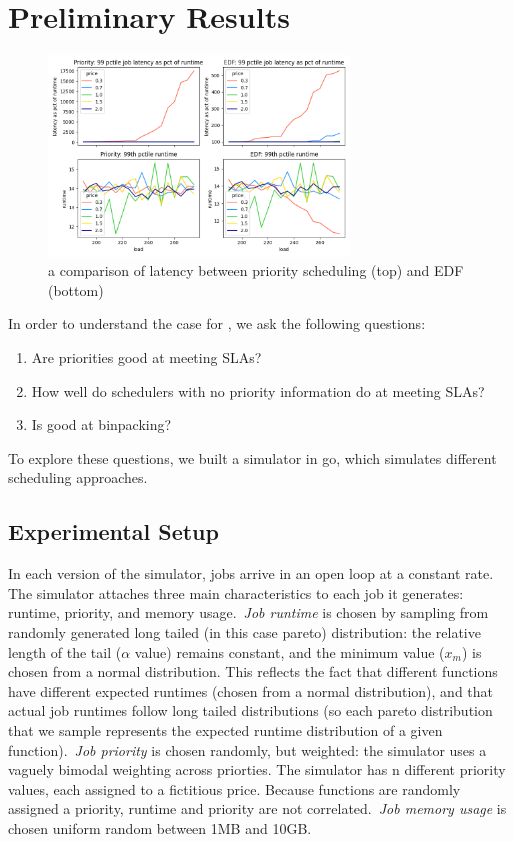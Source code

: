 \section{Preliminary Results}

\begin{figure}[t!]
    \centering
      \includegraphics[width=8cm]{img/ideal_edf_latency.png}
      \caption{ a comparison of latency between priority scheduling (top) and EDF (bottom) }
    \label{fig:edf-vs-prio}
\end{figure}



In order to understand the case for \sys{}, we ask the following questions: 
\begin{enumerate}
    \item Are priorities good at meeting SLAs?
    \item How well do schedulers with no priority information do at meeting SLAs?
    \item Is \sys{} good at binpacking?
\end{enumerate}


To explore these questions, we built a simulator in go\cite{TODO}, which
simulates different scheduling approaches.


\subsection{Experimental Setup}

In each version of the simulator, jobs arrive in an open loop at a constant
rate. The simulator attaches three main characteristics to each job it
generates: runtime, priority, and memory usage.\ \textit{Job runtime} is chosen
by sampling from randomly generated long tailed (in this case pareto)
distribution: the relative length of the tail ($\alpha$ value) remains constant,
and the minimum value ($x_m$) is chosen from a normal distribution. This
reflects the fact that different functions have different expected runtimes
(chosen from a normal distribution), and that actual job runtimes follow long
tailed distributions (so each pareto distribution that we sample represents the
expected runtime distribution of a given function).\ \textit{Job priority} is
chosen randomly, but weighted: the simulator uses a vaguely bimodal weighting
across priorties. The simulator has n different priority values, each assigned
to a fictitious price. Because functions are randomly assigned a priority,
runtime and priority are not correlated.\ \textit{Job memory usage} is chosen
uniform random between 1MB and 10GB.

